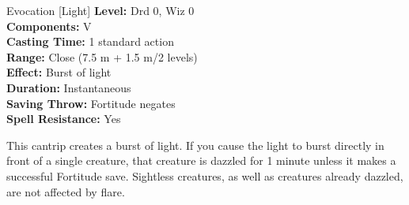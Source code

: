 {Evocation [Light]}
{
	\textbf{Level:}
	Drd 0, Wiz 0\\
	\textbf{Components:}
	V\\
	\textbf{Casting Time:}
	1 standard action\\
	\textbf{Range:}
	Close (7.5 m + 1.5 m/2 levels)\\
	\textbf{Effect:}
	Burst of light\\
	\textbf{Duration:}
	Instantaneous\\
	\textbf{Saving Throw:}
	Fortitude negates\\
	\textbf{Spell Resistance:}
	Yes\\
}
{
	This cantrip creates a burst of light. If you cause the light to burst directly in front of a single creature, that creature is dazzled for 1 minute unless it makes a successful Fortitude save. Sightless creatures, as well as creatures already dazzled, are not affected by flare.

}
